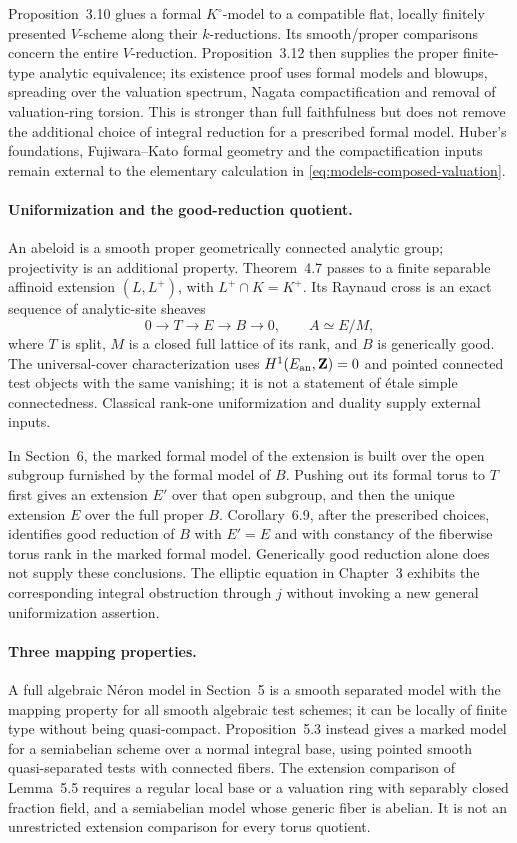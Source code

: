 Proposition~3.10 glues a formal $K^\circ$-model to a compatible
flat, locally finitely presented $V$-scheme along their $k$-reductions.
Its smooth/proper comparisons concern the entire $V$-reduction.
Proposition~3.12 then supplies the proper finite-type analytic equivalence;
its existence proof uses formal models and blowups, spreading over the
valuation spectrum, Nagata compactification and removal of valuation-ring
torsion. This is stronger than full faithfulness but does not remove the
additional choice of integral reduction for a prescribed formal model.
Huber's foundations, Fujiwara--Kato formal geometry and the compactification
inputs remain external to the elementary calculation in
\eqref{eq:models-composed-valuation}.

\paragraph{Uniformization and the good-reduction quotient.}
An abeloid is a smooth proper geometrically connected analytic group;
projectivity is an additional property. Theorem~4.7 passes to a finite
separable affinoid extension $(L,L^+)$, with $L^+\cap K=K^+$.
Its Raynaud cross is an exact sequence of analytic-site sheaves
\[
 0\longrightarrow T\longrightarrow E\longrightarrow B\longrightarrow0,
 \qquad A\simeq E/M,
\]
where $T$ is split, $M$ is a closed full lattice of its rank, and
$B$ is generically good. The universal-cover characterization uses
$H^1(E_{\rm an},\mathbf Z)=0$ and pointed connected test objects with
the same vanishing; it is not a statement of \'etale simple connectedness.
Classical rank-one uniformization and duality supply external inputs.

In Section~6, the marked formal model of the extension is built over
the open subgroup furnished by the formal model of $B$. Pushing out
its formal torus to $T$ first gives an extension $E'$ over that open
subgroup, and then the unique extension $E$ over the full proper $B$.
Corollary~6.9, after the prescribed choices, identifies good reduction of
$B$ with $E'=E$ and with constancy of the fiberwise torus rank in the
marked formal model. Generically good reduction alone does not supply
these conclusions. The elliptic equation in Chapter~3 exhibits the
corresponding integral obstruction through $j$ without invoking a
new general uniformization assertion.

\paragraph{Three mapping properties.}
A full algebraic N\'eron model in Section~5 is a smooth separated
model with the mapping property for all smooth algebraic test schemes;
it can be locally of finite type without being quasi-compact.
Proposition~5.3 instead gives a marked model for a semiabelian scheme
over a normal integral base, using pointed smooth quasi-separated
tests with connected fibers. The extension comparison of Lemma~5.5
requires a regular local base or a valuation ring with separably closed
fraction field, and a semiabelian model whose generic fiber is abelian.
It is not an unrestricted extension comparison for every torus quotient.

